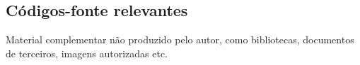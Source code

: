 \begin{anexosenv}
	\chapter{Códigos-fonte relevantes}
	Material complementar não produzido pelo autor, como bibliotecas, documentos de terceiros, imagens autorizadas etc.
\end{anexosenv}
